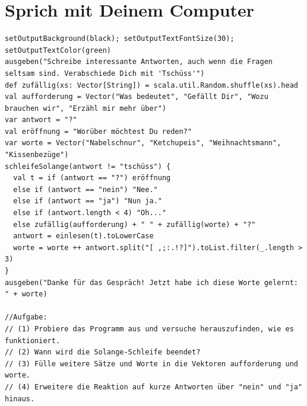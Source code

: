 \chapter{Sprich mit Deinem Computer}
\begin{lstlisting}[basicstyle={\ttfamily\fontsize{13}{16}\selectfont},numbers=none]
setOutputBackground(black); setOutputTextFontSize(30); setOutputTextColor(green)
ausgeben("Schreibe interessante Antworten, auch wenn die Fragen seltsam sind. Verabschiede Dich mit 'Tschüss'")
def zufällig(xs: Vector[String]) = scala.util.Random.shuffle(xs).head
val aufforderung = Vector("Was bedeutet", "Gefällt Dir", "Wozu brauchen wir", "Erzähl mir mehr über")
var antwort = "?"
val eröffnung = "Worüber möchtest Du reden?"
var worte = Vector("Nabelschnur", "Ketchupeis", "Weihnachtsmann", "Kissenbezüge")
schleifeSolange(antwort != "tschüss") {
  val t = if (antwort == "?") eröffnung
  else if (antwort == "nein") "Nee."
  else if (antwort == "ja") "Nun ja."
  else if (antwort.length < 4) "Oh..."
  else zufällig(aufforderung) + " " + zufällig(worte) + "?"
  antwort = einlesen(t).toLowerCase
  worte = worte ++ antwort.split("[ ,;:.!?]").toList.filter(_.length > 3)
}
ausgeben("Danke für das Gespräch! Jetzt habe ich diese Worte gelernt: " + worte)

//Aufgabe:
// (1) Probiere das Programm aus und versuche herauszufinden, wie es funktioniert.
// (2) Wann wird die Solange-Schleife beendet?
// (3) Fülle weitere Sätze und Worte in die Vektoren aufforderung und worte.
// (4) Erweitere die Reaktion auf kurze Antworten über "nein" und "ja" hinaus.
\end{lstlisting}
        
